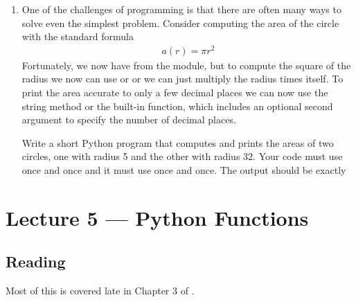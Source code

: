 \documentclass[letterpaper,10pt,english]{sphinxmanual}
\begin{document}
\begin{enumerate}
\item {} 
One of the challenges of programming is that there are often many
ways to solve even the simplest problem.  Consider computing the
area of the circle with the standard formula
\begin{equation*}
\begin{split}a(r) = \pi r^2\end{split}
\end{equation*}
Fortunately, we now have  from the  module, but to
compute the square of the radius we now can use \sphinxcode{\sphinxupquote{**}} or
 or we can just multiply the radius times itself.  To
print the area accurate to only a few decimal places we can now use
the string  method or the  built-in
function, which includes an optional second argument to specify the
number of decimal places.

Write a short Python program that computes and prints the areas of
two circles, one with radius 5 and the other with radius 32.  Your
code must use \sphinxcode{\sphinxupquote{**}} once and  once and it must use
 once and  once.  The output should be
exactly

%
\begin{sphinxVerbatim}[commandchars=\\\{\}]
   
   
\end{sphinxVerbatim}

\end{enumerate}


\chapter{Lecture 5 — Python Functions}
\label{\detokenize{lecture_notes/lec05_functions2:lecture-5-python-functions}}\label{\detokenize{lecture_notes/lec05_functions2::doc}}

\section{Reading}
\label{\detokenize{lecture_notes/lec05_functions2:reading}}
Most of this is covered late in Chapter 3 of .
\end{document}

